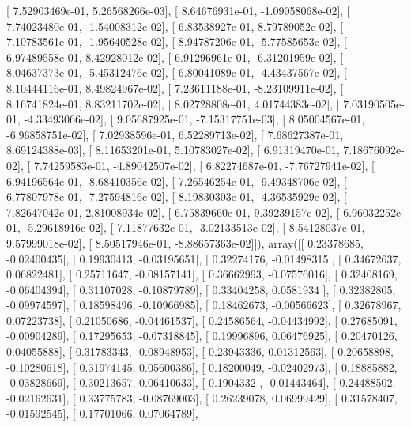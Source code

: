 \documentclass{article}
\begin{document}
       [  7.52903469e-01,   5.26568266e-03],
       [  8.64676931e-01,  -1.09058068e-02],
       [  7.74023480e-01,  -1.54008312e-02],
       [  6.83538927e-01,   8.79789052e-02],
       [  7.10783561e-01,  -1.95640528e-02],
       [  8.94787206e-01,  -5.77585653e-02],
       [  6.97489558e-01,   8.42928012e-02],
       [  6.91296961e-01,  -6.31201959e-02],
       [  8.04637373e-01,  -5.45312476e-02],
       [  6.80041089e-01,  -4.43437567e-02],
       [  8.10444116e-01,   8.49824967e-02],
       [  7.23611188e-01,  -8.23109911e-02],
       [  8.16741824e-01,   8.83211702e-02],
       [  8.02728808e-01,   4.01744383e-02],
       [  7.03190505e-01,  -4.33493066e-02],
       [  9.05687925e-01,  -7.15317751e-03],
       [  8.05004567e-01,  -6.96858751e-02],
       [  7.02938596e-01,   6.52289713e-02],
       [  7.68627387e-01,   8.69124388e-03],
       [  8.11653201e-01,   5.10783027e-02],
       [  6.91319470e-01,   7.18676092e-02],
       [  7.74259583e-01,  -4.89042507e-02],
       [  6.82274687e-01,  -7.76727941e-02],
       [  6.94196564e-01,  -8.68410356e-02],
       [  7.26546254e-01,  -9.49348706e-02],
       [  6.77807978e-01,  -7.27594816e-02],
       [  8.19830303e-01,  -4.36535929e-02],
       [  7.82647042e-01,   2.81008934e-02],
       [  6.75839660e-01,   9.39239157e-02],
       [  6.96032252e-01,  -5.29618916e-02],
       [  7.11877632e-01,  -3.02133513e-02],
       [  8.54128037e-01,   9.57999018e-02],
       [  8.50517946e-01,  -8.88657363e-02]]), array([[ 0.23378685, -0.02400435],
       [ 0.19930413, -0.03195651],
       [ 0.32274176, -0.01498315],
       [ 0.34672637,  0.06822481],
       [ 0.25711647, -0.08157141],
       [ 0.36662993, -0.07576016],
       [ 0.32408169, -0.06404394],
       [ 0.31107028, -0.10879789],
       [ 0.33404258,  0.0581934 ],
       [ 0.32382805, -0.09974597],
       [ 0.18598496, -0.10966985],
       [ 0.18462673, -0.00566623],
       [ 0.32678967,  0.07223738],
       [ 0.21050686, -0.04461537],
       [ 0.24586564, -0.04434992],
       [ 0.27685091, -0.00904289],
       [ 0.17295653, -0.07318845],
       [ 0.19996896,  0.06476925],
       [ 0.20470126,  0.04055888],
       [ 0.31783343, -0.08948953],
       [ 0.23943336,  0.01312563],
       [ 0.20658898, -0.10280618],
       [ 0.31974145,  0.05600386],
       [ 0.18200049, -0.02402973],
       [ 0.18885882, -0.03828669],
       [ 0.30213657,  0.06410633],
       [ 0.1904332 , -0.01443464],
       [ 0.24488502, -0.02162631],
       [ 0.33775783, -0.08769003],
       [ 0.26239078,  0.06999429],
       [ 0.31578407, -0.01592545],
       [ 0.17701066,  0.07064789],
\end{document}
